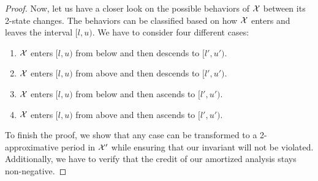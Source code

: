 \begin{proof}
Now, let us have a closer look on the possible behaviors of $\mathcal{X}$ between its 2-state changes. The behaviors can be classified based on how $\mathcal{X}$ enters and leaves the interval $[l,u)$. We have to consider four different cases:
\begin{enumerate}[label=(\alph*)]
	\item $\mathcal{X}$ enters $[l,u)$ from below and then descends to $[l',u')$.\label{itm:schedule_behavior_up_down}
	\item $\mathcal{X}$ enters $[l,u)$ from above and then descends to $[l',u')$.\label{itm:schedule_behavior_down_down}
	\item $\mathcal{X}$ enters $[l,u)$ from below and then ascends to $[l',u')$.\label{itm:schedule_behavior_up_up} 
	\item $\mathcal{X}$ enters $[l,u)$ from above and then ascends to $[l',u')$.\label{itm:schedule_behavior_down_up} 
\end{enumerate}
To finish the proof, we show that any case can be transformed to a 2-approximative period in $\mathcal{X}'$ while ensuring that our invariant will not be violated. Additionally, we have to verify that the credit of our amortized analysis stays non-negative.
	

\end{proof}
